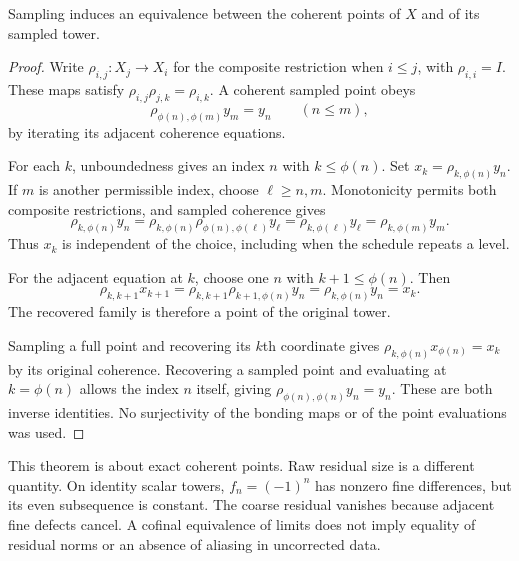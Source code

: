 \begin{KStheorem}\label{KS:KS18}
Sampling induces an equivalence between the coherent points of \(X\) and of its sampled tower.
\end{KStheorem}
\begin{proof}
Write $\rho_{i,j}:X_j\to X_i$ for the composite restriction when $i\le j$, with $\rho_{i,i}=I$. These maps satisfy $\rho_{i,j}\rho_{j,k}=\rho_{i,k}$. A coherent sampled point obeys
\[
 \rho_{\phi(n),\phi(m)}y_m=y_n\qquad(n\le m),
\]
by iterating its adjacent coherence equations.

For each $k$, unboundedness gives an index $n$ with $k\le\phi(n)$. Set $x_k=\rho_{k,\phi(n)}y_n$. If $m$ is another permissible index, choose $\ell\ge n,m$. Monotonicity permits both composite restrictions, and sampled coherence gives
\[
 \rho_{k,\phi(n)}y_n
 =\rho_{k,\phi(n)}\rho_{\phi(n),\phi(\ell)}y_\ell
 =\rho_{k,\phi(\ell)}y_\ell
 =\rho_{k,\phi(m)}y_m.
\]
Thus $x_k$ is independent of the choice, including when the schedule repeats a level.

For the adjacent equation at $k$, choose one $n$ with $k+1\le\phi(n)$. Then
\[
 \rho_{k,k+1}x_{k+1}
 =\rho_{k,k+1}\rho_{k+1,\phi(n)}y_n
 =\rho_{k,\phi(n)}y_n=x_k.
\]
The recovered family is therefore a point of the original tower.

Sampling a full point and recovering its $k$th coordinate gives $\rho_{k,\phi(n)}x_{\phi(n)}=x_k$ by its original coherence. Recovering a sampled point and evaluating at $k=\phi(n)$ allows the index $n$ itself, giving $\rho_{\phi(n),\phi(n)}y_n=y_n$. These are both inverse identities. No surjectivity of the bonding maps or of the point evaluations was used.
\end{proof}
This theorem is about exact coherent points. Raw residual size is a different quantity. On identity scalar towers, \(f_n=(-1)^n\) has nonzero fine differences, but its even subsequence is constant. The coarse residual vanishes because adjacent fine defects cancel. A cofinal equivalence of limits does not imply equality of residual norms or an absence of aliasing in uncorrected data.

